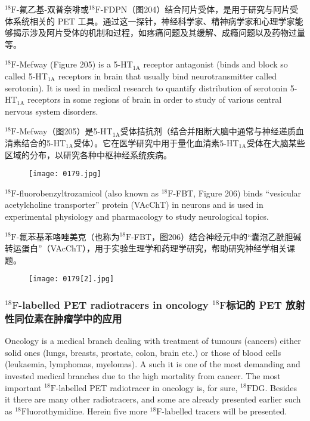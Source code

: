 \documentclass[dvipsnames, svgnames,a4paper,11pt]{article}
\begin{document}
${}^\mathrm{18}\mathrm{F}$-氟乙基-双普奈啡或${}^\mathrm{18}\mathrm{F}$-FDPN（图204）结合阿片受体，是用于研究与阿片受体系统相关的 PET 工具。通过这一探针，神经科学家、精神病学家和心理学家能够揭示涉及阿片受体的机制和过程，如疼痛问题及其缓解、成瘾问题以及药物过量等。

${}^\mathrm{18}\mathrm{F}$-Mefway (Figure 205) is a 5-HT${}_\mathrm{1A}$ receptor antagonist (binds and block so called
5-HT${}_\mathrm{1A}$ receptors in brain that usually bind neurotransmitter called serotonin). It is
used in medical research to quantify distribution of serotonin 5-HT${}_\mathrm{1A}$ receptors in
some regions of brain in order to study of various central nervous system disorders.

${}^\mathrm{18}\mathrm{F}$-Mefway（图205）是5-HT${}_\mathrm{1A}$受体拮抗剂（结合并阻断大脑中通常与神经递质血清素结合的5-HT${}_\mathrm{1A}$受体）。它在医学研究中用于量化血清素5-HT${}_\mathrm{1A}$受体在大脑某些区域的分布，以研究各种中枢神经系统疾病。

\begin{figure}[h]
	\centering
    \texttt{[image: 0179.jpg]}   
     \label{fig205}
\end{figure}


${}^\mathrm{18}\mathrm{F}$-fluorobenzyltrozamicol (also known as ${}^\mathrm{18}\mathrm{F}$-FBT, Figure 206) binds “vesicular
acetylcholine transporter” protein (VAcChT) in neurons and is used in experimental
physiology and pharmacology to study neurological topics.

${}^\mathrm{18}\mathrm{F}$-氟苯基苯咯唑美克（也称为${}^\mathrm{18}\mathrm{F}$-FBT，图206）结合神经元中的“囊泡乙酰胆碱转运蛋白”（VAcChT），用于实验生理学和药理学研究，帮助研究神经学相关课题。

\begin{figure}[h]
	\centering
    \texttt{[image: 0179[2].jpg]}   
     \label{fig206}
\end{figure}


\subsubsection{${}^\mathrm{18}\mathrm{F}$-labelled PET radiotracers in oncology ${}^\mathrm{18}\mathrm{F}$标记的 PET 放射性同位素在肿瘤学中的应用}

Oncology is a medical branch dealing with treatment of tumours (cancers) either
solid ones (lungs, breasts, prostate, colon, brain etc.) or those of blood cells
(leukaemia, lymphomas, myelomas). A such it is one of the most demanding and
invested medical branches due to the high mortality from cancer. The most important
${}^\mathrm{18}\mathrm{F}$-labelled PET radiotracer in oncology is, for sure, ${}^\mathrm{18}\mathrm{F}$DG. Besides it there are
many other radiotracers, and some are already presented earlier such as
${}^\mathrm{18}\mathrm{F}$luorothymidine. Herein five more ${}^\mathrm{18}\mathrm{F}$-labelled tracers will be presented.
\end{document}
